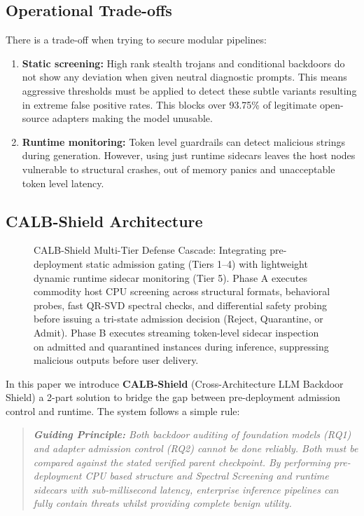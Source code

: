 \subsection{Operational Trade-offs}
There is a trade-off when trying to secure modular pipelines:
\begin{enumerate}
    \item \textbf{Static screening:} High rank stealth trojans and conditional backdoors do not show any deviation when given neutral diagnostic prompts. This means aggressive thresholds must be applied to detect these subtle variants resulting in extreme false positive rates. This blocks over 93.75\% of legitimate open-source adapters making the model unusable.
    \item \textbf{Runtime monitoring:} Token level guardrails can detect malicious strings during generation. However, using just runtime sidecars leaves the host nodes vulnerable to structural crashes, out of memory panics and unacceptable token level latency.
\end{enumerate}

\subsection{CALB-Shield Architecture}

\begin{figure}[t]
\centering
{}
\caption{CALB-Shield Multi-Tier Defense Cascade: Integrating pre-deployment static admission gating (Tiers 1--4) with lightweight dynamic runtime sidecar monitoring (Tier 5). Phase A executes commodity host CPU screening across structural formats, behavioral probes, fast QR-SVD spectral checks, and differential safety probing before issuing a tri-state admission decision (Reject, Quarantine, or Admit). Phase B executes streaming token-level sidecar inspection on admitted and quarantined instances during inference, suppressing malicious outputs before user delivery.}
\label{fig:architecture}
\end{figure}
In this paper we introduce \textbf{CALB-Shield} (Cross-Architecture LLM Backdoor Shield) a 2-part solution to bridge the gap between pre-deployment admission control and runtime. The system follows a simple rule:

\begin{quote}
\textit{\textbf{Guiding Principle:} Both backdoor auditing of foundation models (RQ1) and adapter admission control (RQ2) cannot be done reliably. Both must be compared against the stated verified parent checkpoint. By performing pre-deployment CPU based structure and Spectral Screening and runtime sidecars with sub-millisecond latency, enterprise inference pipelines can fully contain threats whilst providing complete benign utility.}
\end{quote}


